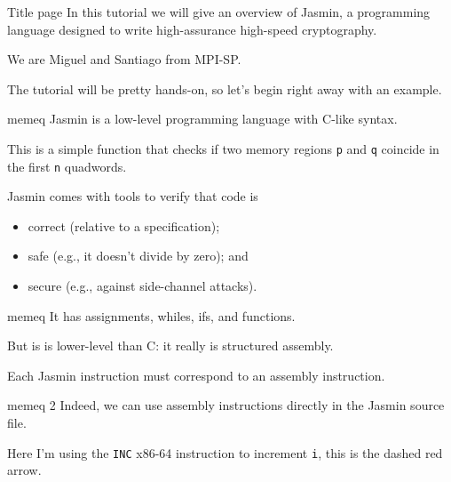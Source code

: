 \documentclass[
  xcolor={table,dvipsnames},
]{beamer}
\newcommand{\hint}[1]{{\color{Red}{[HINT: #1]}}}
\newcommand{\nextframe}{\hint{NEXT FRAME}}
\begin{document}
\begin{frame}{Title page}
  In this tutorial we will give an overview of Jasmin, a programming language
  designed to write high-assurance high-speed cryptography.

  \vfill

  We are Miguel and Santiago from MPI-SP.

  \vfill

  The tutorial will be pretty hands-on, so let's begin right away with an
  example.

  \nextframe
\end{frame}

\begin{frame}{memeq}
  Jasmin is a low-level programming language with C-like syntax.

  \vfill

  This is a simple function that checks if two memory regions \texttt{p}
  and \texttt{q} coincide in the first \texttt{n} quadwords.

  \vfill

  Jasmin comes with tools to verify that code is
  \begin{itemize}
  \itemsep=1em
  \item[] correct (relative to a specification);
  \item[] safe (e.g., it doesn't divide by zero); and
  \item[] secure (e.g., against side-channel attacks).
  \end{itemize}
\end{frame}

\begin{frame}{memeq}
  It has assignments, whiles, ifs, and functions.

  \vfill

  But is is lower-level than C: it really is structured assembly.

  \vfill

  Each Jasmin instruction must correspond to an assembly instruction.

  \nextframe
\end{frame}

\begin{frame}{memeq 2}
  Indeed, we can use assembly instructions directly in the Jasmin source file.

  \nextframe

  \vfill

  Here I'm using the \texttt{INC} x86-64 instruction to increment \texttt{i},
  this is the dashed red arrow.
\end{frame}
\end{document}
